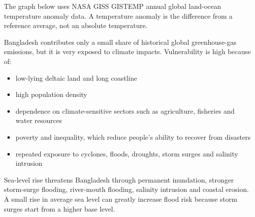 \documentclass[11pt,a4paper]{article}
\begin{document}
The graph below uses NASA GISS GISTEMP annual global land-ocean temperature anomaly data. A temperature anomaly is the difference from a reference average, not an absolute temperature.

\begin{center}
\end{center}


Bangladesh contributes only a small share of historical global greenhouse-gas emissions, but it is very exposed to climate impacts. Vulnerability is high because of:
\begin{itemize}
  \item low-lying deltaic land and long coastline
  \item high population density
  \item dependence on climate-sensitive sectors such as agriculture, fisheries and water resources
  \item poverty and inequality, which reduce people's ability to recover from disasters
  \item repeated exposure to cyclones, floods, droughts, storm surges and salinity intrusion
\end{itemize}

\BangladeshRiskMap

Sea-level rise threatens Bangladesh through permanent inundation, stronger storm-surge flooding, river-mouth flooding, salinity intrusion and coastal erosion. A small rise in average sea level can greatly increase flood risk because storm surges start from a higher base level.
\end{document}
